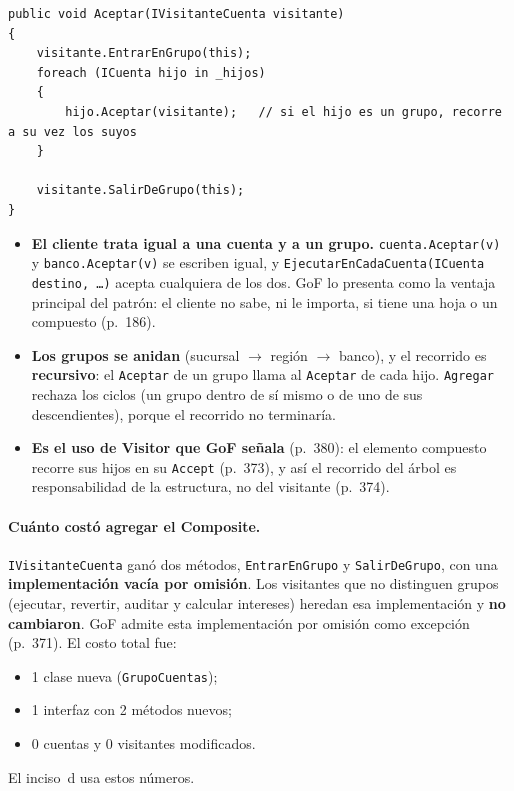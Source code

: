 \begin{lstlisting}[basicstyle=\ttfamily\footnotesize, columns=fullflexible, keepspaces=true, caption={\texttt{GrupoCuentas.Aceptar}: el recorrido recursivo del árbol.}]
public void Aceptar(IVisitanteCuenta visitante)
{
    visitante.EntrarEnGrupo(this);
    foreach (ICuenta hijo in _hijos)
    {
        hijo.Aceptar(visitante);   // si el hijo es un grupo, recorre a su vez los suyos
    }

    visitante.SalirDeGrupo(this);
}
\end{lstlisting}

\begin{itemize}
  \item \textbf{El cliente trata igual a una cuenta y a un grupo.} \texttt{cuenta.Aceptar(v)}
        y \texttt{banco.Aceptar(v)} se escriben igual, y
        \texttt{EjecutarEnCadaCuenta(\allowbreak{}ICuenta destino, \ldots)} acepta cualquiera de los dos.
        GoF lo presenta como la ventaja principal del patrón: el cliente no sabe, ni le
        importa, si tiene una hoja o un compuesto (p.~186).
  \item \textbf{Los grupos se anidan} (sucursal $\rightarrow$ región $\rightarrow$ banco), y
        el recorrido es \textbf{recursivo}: el \texttt{Aceptar} de un grupo llama al
        \texttt{Aceptar} de cada hijo. \texttt{Agregar} rechaza los ciclos (un grupo dentro de
        sí mismo o de uno de sus descendientes), porque el recorrido no terminaría.
  \item \textbf{Es el uso de Visitor que GoF señala} (p.~380): el elemento compuesto recorre
        sus hijos en su \texttt{Accept} (p.~373), y así el recorrido del árbol es
        responsabilidad de la estructura, no del visitante (p.~374).
\end{itemize}

\paragraph{Cuánto costó agregar el Composite.}
\texttt{IVisitanteCuenta} ganó dos métodos, \texttt{EntrarEnGrupo} y \texttt{SalirDeGrupo},
con una \textbf{implementación vacía por omisión}. Los visitantes que no distinguen grupos
(ejecutar, revertir, auditar y calcular intereses) heredan esa implementación y \textbf{no
cambiaron}. GoF admite esta implementación por omisión como excepción (p.~371). El costo
total fue:
\begin{itemize}
  \item 1 clase nueva (\texttt{GrupoCuentas});
  \item 1 interfaz con 2 métodos nuevos;
  \item 0 cuentas y 0 visitantes modificados.
\end{itemize}
El inciso~d usa estos números.

